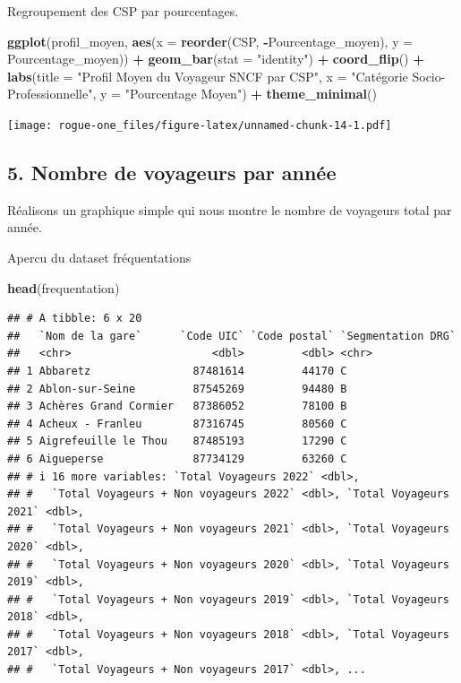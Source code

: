 \documentclass[
]{article}
\newenvironment{Shaded}{\begin{snugshade}}{\end{snugshade}}
\newcommand{\AttributeTok}[1]{\textcolor[rgb]{0.13,0.29,0.53}{#1}}
\newcommand{\FunctionTok}[1]{\textcolor[rgb]{0.13,0.29,0.53}{\textbf{#1}}}
\newcommand{\NormalTok}[1]{#1}
\newcommand{\SpecialCharTok}[1]{\textcolor[rgb]{0.81,0.36,0.00}{\textbf{#1}}}
\newcommand{\StringTok}[1]{\textcolor[rgb]{0.31,0.60,0.02}{#1}}
\begin{document}
Regroupement des CSP par pourcentages.

\begin{Shaded}
\begin{Highlighting}[]
\FunctionTok{ggplot}\NormalTok{(profil\_moyen, }\FunctionTok{aes}\NormalTok{(}\AttributeTok{x =} \FunctionTok{reorder}\NormalTok{(CSP, }\SpecialCharTok{{-}}\NormalTok{Pourcentage\_moyen), }\AttributeTok{y =}\NormalTok{ Pourcentage\_moyen)) }\SpecialCharTok{+}
  \FunctionTok{geom\_bar}\NormalTok{(}\AttributeTok{stat =} \StringTok{"identity"}\NormalTok{) }\SpecialCharTok{+}
  \FunctionTok{coord\_flip}\NormalTok{() }\SpecialCharTok{+} 
  \FunctionTok{labs}\NormalTok{(}\AttributeTok{title =} \StringTok{"Profil Moyen du Voyageur SNCF par CSP"}\NormalTok{,}
       \AttributeTok{x =} \StringTok{"Catégorie Socio{-}Professionnelle"}\NormalTok{,}
       \AttributeTok{y =} \StringTok{"Pourcentage Moyen"}\NormalTok{) }\SpecialCharTok{+}
  \FunctionTok{theme\_minimal}\NormalTok{()}
\end{Highlighting}
\end{Shaded}

\texttt{[image: rogue-one\_files/figure-latex/unnamed-chunk-14-1.pdf]}

\hypertarget{nombre-de-voyageurs-par-annuxe9e}{%
\subsection{5. Nombre de voyageurs par
année}\label{nombre-de-voyageurs-par-annuxe9e}}

Réalisons un graphique simple qui nous montre le nombre de voyageurs
total par année.

Apercu du dataset fréquentations

\begin{Shaded}
\begin{Highlighting}[]
\FunctionTok{head}\NormalTok{(frequentation)}
\end{Highlighting}
\end{Shaded}

\begin{verbatim}
## # A tibble: 6 x 20
##   `Nom de la gare`      `Code UIC` `Code postal` `Segmentation DRG`
##   <chr>                      <dbl>         <dbl> <chr>             
## 1 Abbaretz                87481614         44170 C                 
## 2 Ablon-sur-Seine         87545269         94480 B                 
## 3 Achères Grand Cormier   87386052         78100 B                 
## 4 Acheux - Franleu        87316745         80560 C                 
## 5 Aigrefeuille le Thou    87485193         17290 C                 
## 6 Aigueperse              87734129         63260 C                 
## # i 16 more variables: `Total Voyageurs 2022` <dbl>,
## #   `Total Voyageurs + Non voyageurs 2022` <dbl>, `Total Voyageurs 2021` <dbl>,
## #   `Total Voyageurs + Non voyageurs 2021` <dbl>, `Total Voyageurs 2020` <dbl>,
## #   `Total Voyageurs + Non voyageurs 2020` <dbl>, `Total Voyageurs 2019` <dbl>,
## #   `Total Voyageurs + Non voyageurs 2019` <dbl>, `Total Voyageurs 2018` <dbl>,
## #   `Total Voyageurs + Non voyageurs 2018` <dbl>, `Total Voyageurs 2017` <dbl>,
## #   `Total Voyageurs + Non voyageurs 2017` <dbl>, ...
\end{verbatim}
\end{document}
